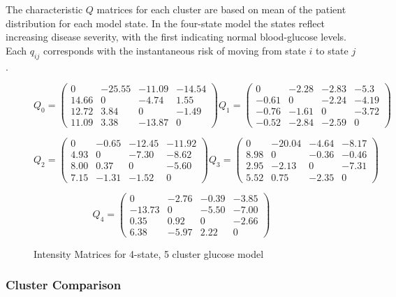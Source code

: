 The characteristic $Q$ matrices for each cluster are based on mean of the patient distribution for each model state.  In the four-state model the states reflect increasing disease severity, with the first indicating normal blood-glucose levels. Each $q_{ij}$ corresponds with the instantaneous risk of moving from state $i$ to state $j$.

\begin{figure}
\[Q_0= \left( \begin{array}{cccc}
0     &   -25.55&   -11.09& -14.54\\
14.66 &        0&    -4.74&	  1.55\\
12.72 &     3.84&	     0&  -1.49\\
11.09 & 	3.38&  	-13.87&    0

\end{array} \right)
%
Q_1= \left( \begin{array}{cccc}
0 & -2.28	&-2.83	&-5.3\\
-0.61&  0&	-2.24&	-4.19\\
-0.76&	-1.61&	0 &  -3.72\\
-0.52&	-2.84&	-2.59& 0
\end{array} \right)
\]

\[ Q_2= \left( \begin{array}{cccc}
0& -0.65&	-12.45&	-11.92\\
4.93&    0&	-7.30&	-8.62\\
8.00&	0.37& 0&	-5.60\\
7.15&	-1.31&	-1.52& 0
\end{array} \right)
%
Q_3= \left( \begin{array}{cccc}
0 & -20.04&	-4.64&	-8.17\\
8.98& 0&	-0.36&	-0.46\\
2.95&	-2.13& 0&	-7.31\\
5.52&	0.75&	-2.35& 0
\end{array} \right)
\]

\[ Q_4= \left( \begin{array}{cccc}
0 & -2.76&	-0.39&	-3.85 \\
-13.73& 0&	-5.50&	-7.00 \\
0.35&	0.92&   0&	-2.66 \\
6.38&	-5.97&	2.22& 0


\end{array} \right)
\]
\caption{Intensity Matrices for 4-state, 5 cluster glucose model}
\label{fig:glucq}
\end{figure}

\subsubsection{Cluster Comparison}


